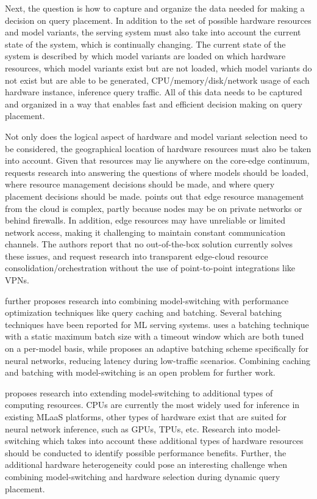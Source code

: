 Next, the question is how to capture and organize the data needed for making a decision on query placement.
In addition to the set of possible hardware resources and model variants, the serving system must also take into account the current state of the system, which is continually changing.
The current state of the system is described by which model variants are loaded on which hardware resources, which model variants exist but are not loaded, which model variants do not exist but are able to be generated, CPU/memory/disk/network usage of each hardware instance, inference query traffic.
All of this data needs to be captured and organized in a way that enables fast and efficient decision making on query placement.

Not only does the logical aspect of hardware and model variant selection need to be considered, the geographical location of hardware resources must also be taken into account.
Given that resources may lie anywhere on the core-edge continuum, \cite{Yadwadkar2019} requests research into answering the questions of where models should be loaded, where resource management decisions should be made, and where query placement decisions should be made.
\cite{Rausch2019a} points out that edge resource management from the cloud is complex, partly because nodes may be on private networks or behind firewalls.
In addition, edge resources may have unreliable or limited network access, making it challenging to maintain constant communication channels.
The authors report that no out-of-the-box solution currently solves these issues, and request research into transparent edge-cloud resource consolidation/orchestration without the use of point-to-point integrations like VPNs.

\cite{Zhang2020} further proposes research into combining model-switching with performance optimization techniques like query caching and batching.
Several batching techniques have been reported for ML serving systems.
\cite{Crankshaw2017} uses a batching technique with a static maximum batch size with a timeout window which are both tuned on a per-model basis, while \cite{Choi2021} proposes an adaptive batching scheme specifically for neural networks, reducing latency during low-traffic scenarios.
Combining caching and batching with model-switching is an open problem for further work.

\cite{Zhang2020} proposes research into extending model-switching to additional types of computing resources.
CPUs are currently the most widely used for inference in existing MLaaS platforms, other types of hardware exist that are suited for neural network inference, such as GPUs, TPUs, etc.
Research into model-switching which takes into account these additional types of hardware resources should be conducted to identify possible performance benefits.
Further, the additional hardware heterogeneity could pose an interesting challenge when combining model-switching and hardware selection during dynamic query placement.

